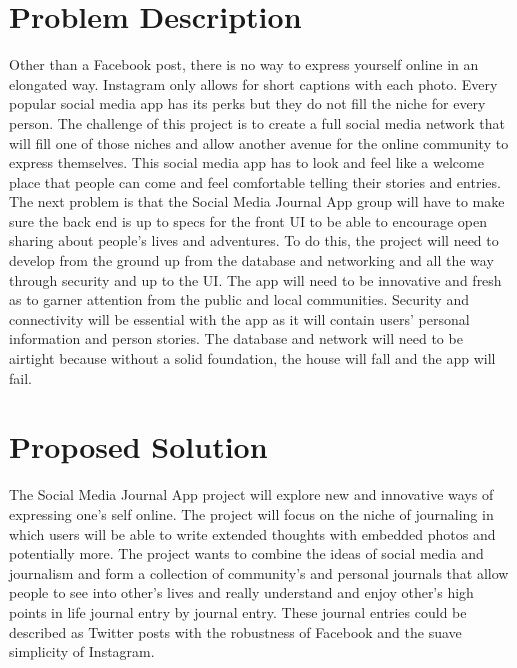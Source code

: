 \documentclass[letterpaper,10pt,titlepage]{article}
\begin{document}
\section*{Problem Description}\par
\hspace{4ex}Other than a Facebook post, there is no way to express
 yourself online in an elongated way. Instagram only allows for short captions 
 with each photo. Every popular social media app has its perks but they do not 
 fill the niche for every person. The challenge of this project is to create a
 full social media network that will fill one of those niches and allow another 
 avenue for the online community to express themselves. This social media app 
 has to look and feel like a welcome place that people can come and feel comfortable
telling their stories and entries. The next problem is that the Social Media Journal
App group will have to make sure the back end is up to specs for the front UI to be
able to encourage open sharing about people's lives and adventures. To do this, the 
 project will need to develop from the ground up from the database and networking
 and all the way through security and up to the UI. The app will need to be 
innovative and fresh as to garner attention from the public and local communities.
Security and connectivity will be essential with the app as it will contain users'
personal information and person stories. The database and network will need to be
airtight because without a solid foundation, the house will fall and the app will 
fail.  

\section*{Proposed Solution}\par
\hspace{4ex}The Social Media Journal App project will explore new and innovative 
ways of expressing one's self online. The project will focus on the niche of 
journaling in which users will be able to write extended thoughts with embedded 
photos and potentially more. The project wants to combine the ideas of social
media and journalism and form a collection of community's and personal journals 
that allow people to see into other's lives and really understand and enjoy 
other's high points in life journal entry by journal entry. These journal entries
could be described as Twitter posts with the robustness of Facebook and the 
suave simplicity of Instagram. 
\end{document}
